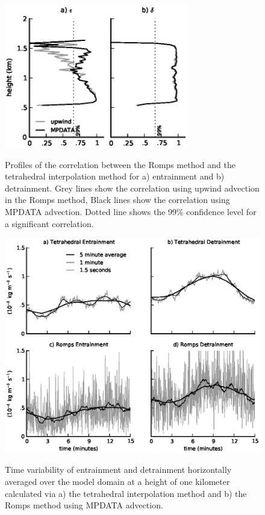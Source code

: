 \documentclass[12pt]{article}
\begin{document}
\begin{figure}[t]
  \noindent
  \includegraphics[width=19pc,angle=0]{./figures/correlations}\\
  \caption{
  Profiles of the correlation between the Romps method and the
  tetrahedral interpolation method for a) entrainment and b) detrainment.  Grey 
  lines show the correlation using upwind advection in the Romps method, Black 
  lines show the correlation using MPDATA advection.  Dotted line shows the 
  99\% confidence level for a significant correlation.
  }
  \label{fig:correlations}
\end{figure}

\begin{figure}[t]
  \noindent
  \includegraphics[width=39pc,angle=0]{./figures/averaging_convergence}\\ 
  \caption{Time variability of entrainment and detrainment horizontally 
  averaged over the model domain at a height of one kilometer calculated via 
  a) the tetrahedral interpolation method and b) the Romps method using MPDATA 
  advection.
  }
  \label{fig:averaging_convergence}
\end{figure}
\end{document}
